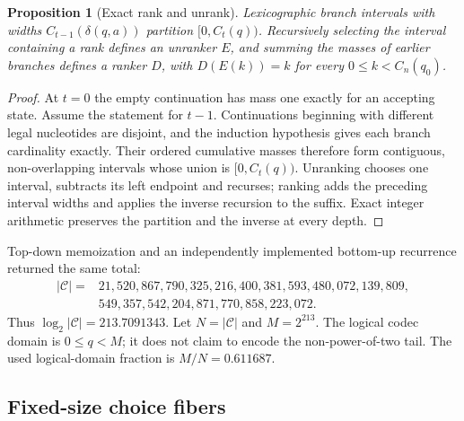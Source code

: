 \documentclass[10pt]{article}
\newtheorem{proposition}{Proposition}
\begin{document}
\begin{proposition}[Exact rank and unrank]
Lexicographic branch intervals with widths $C_{t-1}(\delta(q,a))$ partition $[0,C_t(q))$. Recursively selecting the interval containing a rank defines an unranker $E$, and summing the masses of earlier branches defines a ranker $D$, with $D(E(k))=k$ for every $0\leq k<C_n(q_0)$.
\end{proposition}

\begin{proof}
At $t=0$ the empty continuation has mass one exactly for an accepting state. Assume the statement for $t-1$. Continuations beginning with different legal nucleotides are disjoint, and the induction hypothesis gives each branch cardinality exactly. Their ordered cumulative masses therefore form contiguous, non-overlapping intervals whose union is $[0,C_t(q))$. Unranking chooses one interval, subtracts its left endpoint and recurses; ranking adds the preceding interval widths and applies the inverse recursion to the suffix. Exact integer arithmetic preserves the partition and the inverse at every depth.
\end{proof}

Top-down memoization and an independently implemented bottom-up recurrence returned the same total:
\[
\begin{aligned}
 |\mathcal C|={}&21{,}520{,}867{,}790{,}325{,}216{,}400{,}381{,}593{,}480{,}072{,}139{,}809{,}\\
 &549{,}357{,}542{,}204{,}871{,}770{,}858{,}223{,}072.
\end{aligned}
\]
Thus $\log_2|\mathcal C|=213.7091343$. Let $N=|\mathcal C|$ and $M=2^{213}$. The logical codec domain is $0\leq q<M$; it does not claim to encode the non-power-of-two tail. The used logical-domain fraction is $M/N=0.611687$.

\subsection{Fixed-size choice fibers}
\end{document}
